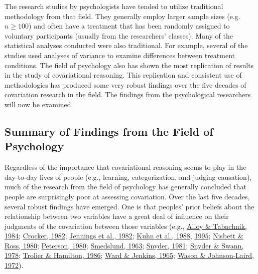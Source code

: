 \documentclass[11pt]{umnthesis}
\begin{document}
The research studies by psychologists have tended to utilize traditional methodology from that field. They generally employ larger sample sizes (e.g.~\(n \geq 100\)) and often have a treatment that has been randomly assigned to voluntary participants (usually from the researchers' classes). Many of the statistical analyses conducted were also traditional. For example, several of the studies used analyses of variance to examine differences between treatment conditions. The field of psychology also has shown the most replication of results in the study of covariational reasoning. This replication and consistent use of methodologies has produced some very robust findings over the five decades of covariation research in the field. The findings from the psychological researchers will now be examined.

\hypertarget{summary-of-findings-from-the-field-of-psychology}{%
\subsection{Summary of Findings from the Field of Psychology}\label{summary-of-findings-from-the-field-of-psychology}}

Regardless of the importance that covariational reasoning seems to play in the day-to-day lives of people (e.g., learning, categorization, and judging causation), much of the research from the field of psychology has generally concluded that people are surprisingly poor at assessing covariation. Over the last five decades, several robust findings have emerged. One is that peoples' prior beliefs about the relationship between two variables have a great deal of influence on their judgments of the covariation between those variables (e.g., \protect\hyperlink{ref-alloy:1984}{Alloy \& Tabachnik, 1984}; \protect\hyperlink{ref-crocker:1982}{Crocker, 1982}; \protect\hyperlink{ref-jennings:1982}{Jennings et al., 1982}; \protect\hyperlink{ref-kuhn:1988}{Kuhn et al., 1988}, \protect\hyperlink{ref-kuhn:1995}{1995}; \protect\hyperlink{ref-nisbett:1980}{Nisbett \& Ross, 1980}; \protect\hyperlink{ref-peterson:1980}{Peterson, 1980}; \protect\hyperlink{ref-smedslund:1963}{Smedslund, 1963}; \protect\hyperlink{ref-snyder:1981}{Snyder, 1981}; \protect\hyperlink{ref-snyder:1978}{Snyder \& Swann, 1978}; \protect\hyperlink{ref-trolier:1986}{Trolier \& Hamilton, 1986}; \protect\hyperlink{ref-ward:1965}{Ward \& Jenkins, 1965}; \protect\hyperlink{ref-wason:1972}{Wason \& Johnson-Laird, 1972}).
\end{document}
